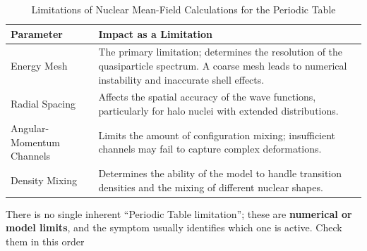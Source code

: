 \documentclass[a4paper, 10pt, onepage]{elegantbook}
\begin{document}
{\begin{table}[h]
\centering
\begin{tabular}{|l|p{8cm}|}
\hline
\textbf{Parameter} & \textbf{Impact as a Limitation} \\ \hline
Energy Mesh & The primary limitation; determines the resolution of the quasiparticle spectrum. 
A coarse mesh leads to numerical instability and inaccurate shell effects. \\ \hline
Radial Spacing & Affects the spatial accuracy of the wave functions, particularly for halo nuclei with extended 
distributions. \\ \hline
Angular-Momentum Channels & Limits the amount of configuration mixing; insufficient channels may fail to capture 
complex deformations. \\ \hline
Density Mixing & Determines the ability of the model to handle transition densities and the mixing of different nuclear 
shapes. \\ \hline
\end{tabular}
\caption{Limitations of Nuclear Mean-Field Calculations for the Periodic Table}
\end{table}

There is no single inherent “Periodic Table limitation”; these are \textbf{numerical or model limits}, 
and the symptom usually identifies which one is active. Check them in this order

}
\end{document}
